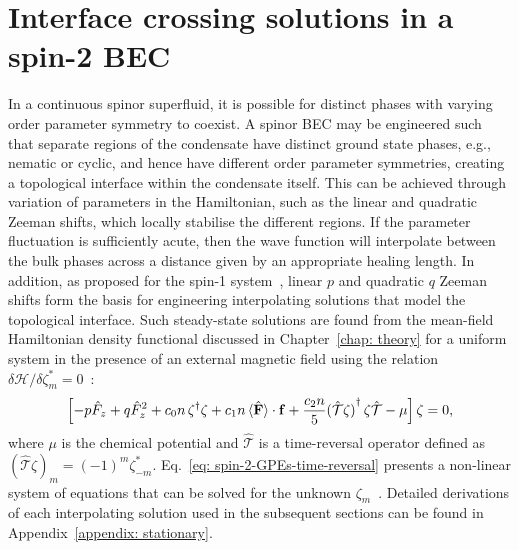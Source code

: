 \section{Interface crossing solutions in a spin-2 BEC}
In a continuous spinor superfluid, it is possible for distinct phases with
varying order parameter symmetry to coexist.
A spinor BEC may be engineered such that separate regions of the condensate
have distinct ground state phases, e.g., nematic or cyclic, and hence have
different order parameter symmetries, creating a topological interface within
the condensate itself.
This can be achieved through variation of parameters in the Hamiltonian, such as
the linear and quadratic Zeeman shifts, which locally stabilise the different
regions.
If the parameter fluctuation is sufficiently acute, then the wave function will
interpolate between the bulk phases across a distance given by an appropriate
healing length.
In addition, as proposed for the spin-1 system~\cite{Borgh2014}, linear \(p\)
and quadratic \(q\) Zeeman shifts form the basis for engineering interpolating
solutions that model the topological interface.
Such steady-state solutions are found from the mean-field Hamiltonian density
functional discussed in Chapter~\ref{chap: theory} for a uniform system in the
presence of an external magnetic field using the relation \(\delta \mathcal{H}
/ \delta \zeta_m^*=0\)~\cite{Kawaguchi2012}:
\begin{equation}\label{eq: spin-2-GPEs-time-reversal}
    \left[-p \hat{F}_z + q \hat{F}^2_z + c_0n \, \zeta^\dagger \zeta
        + c_1n \, \langle\hat{\vb{F}}\rangle\cdot \vb{f}
        + \frac{c_2n}{5}{(\hat{\mathcal{T}}\zeta)}^\dagger \,
        \zeta\hat{\mathcal{T}} -\mu \right] \zeta = 0,
\end{equation}
where \(\mu \) is the chemical potential and \(\hat{\mathcal{T}}\) is a
time-reversal operator defined as \({(\hat{\mathcal{T}}\zeta)}_m =
{(-1)}^m\zeta_{-m}^*\).
Eq.~\eqref{eq: spin-2-GPEs-time-reversal} presents a non-linear system of
equations that can be solved for the unknown
\(\zeta_m\)~\cite{Ciobanu2000,Kawaguchi2012}.
Detailed derivations of each interpolating solution used in the subsequent
sections can be found in Appendix~\ref{appendix: stationary}.

